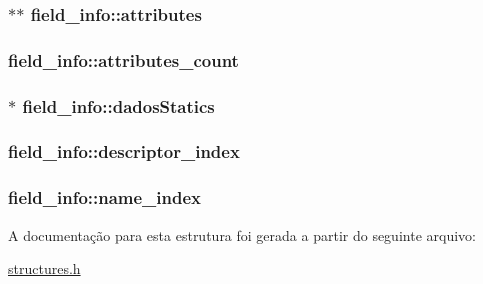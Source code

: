 \subsubsection[{\texorpdfstring{attributes}{attributes}}]{$\ast$$\ast$ field\+\_\+info\+::attributes}\hypertarget{structfield__info_a754de0f0fd6e62c413cca2979ca5debd}{}\label{structfield__info_a754de0f0fd6e62c413cca2979ca5debd}
\subsubsection[{\texorpdfstring{attributes\+\_\+count}{attributes_count}}]{ field\+\_\+info\+::attributes\+\_\+count}\hypertarget{structfield__info_a83bfa4ff84a608e3dbd1c3968ebe1b80}{}\label{structfield__info_a83bfa4ff84a608e3dbd1c3968ebe1b80}
\subsubsection[{\texorpdfstring{dados\+Statics}{dadosStatics}}]{$\ast$ field\+\_\+info\+::dados\+Statics}\hypertarget{structfield__info_aef0cb22b05664f3e93c74afa289fe865}{}\label{structfield__info_aef0cb22b05664f3e93c74afa289fe865}
\subsubsection[{\texorpdfstring{descriptor\+\_\+index}{descriptor_index}}]{ field\+\_\+info\+::descriptor\+\_\+index}\hypertarget{structfield__info_a12dd492b7fb1d61da1ac14938d97b07f}{}\label{structfield__info_a12dd492b7fb1d61da1ac14938d97b07f}
\subsubsection[{\texorpdfstring{name\+\_\+index}{name_index}}]{ field\+\_\+info\+::name\+\_\+index}\hypertarget{structfield__info_a425e3ae85badd81c67ef00acca85ad9e}{}\label{structfield__info_a425e3ae85badd81c67ef00acca85ad9e}


A documentação para esta estrutura foi gerada a partir do seguinte arquivo\+:\begin{DoxyCompactItemize}
\item 
\hyperlink{structures_8h}{structures.\+h}\end{DoxyCompactItemize}
